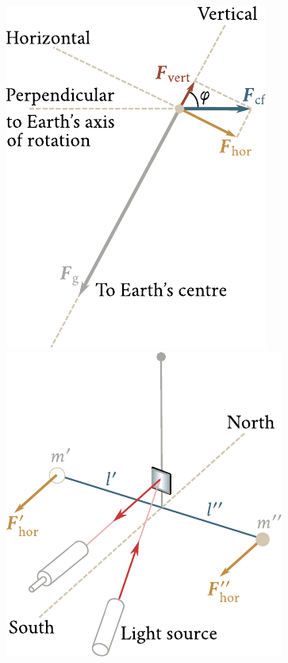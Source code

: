 \begin{figure}[!htb]
	\begin{minipage}[t]{0.5\linewidth}
		\begin{center}
			\includegraphics[scale=0.9]{figures/ch_06/fig_6_5.pdf}
			\caption[]{}
			\label{fig:6_5}
		\end{center}
	\end{minipage}
	\hspace{-0.05cm}
	\begin{minipage}[t]{0.5\linewidth}
		\begin{center}
			\includegraphics[scale=0.9]{figures/ch_06/fig_6_6.pdf}
			\caption[]{}
			\label{fig:6_6}
		\end{center}
	\end{minipage}
\end{figure}

